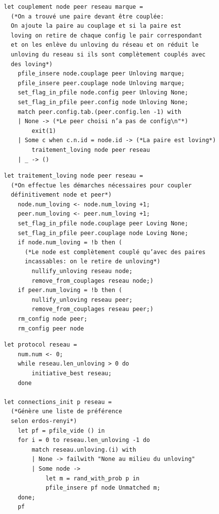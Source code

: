 \documentclass[aspectratio=43]{beamer}
\begin{document}
\begin{frame}[fragile]
    \begin{verbatim}
let couplement node peer reseau marque =
  (*On a trouvé une paire devant être couplée:
  On ajoute la paire au couplage et si la paire est
  loving on retire de chaque config le pair correspondant
  et on les enlève du unloving du réseau et on réduit le
  unloving du reseau si ils sont complètement couplés avec
  des loving*)
    pfile_insere node.couplage peer Unloving marque;
    pfile_insere peer.couplage node Unloving marque;
    set_flag_in_pfile node.config peer Unloving None;
    set_flag_in_pfile peer.config node Unloving None;
    match peer.config.tab.(peer.config.len -1) with
    | None -> (*Le peer choisi n’a pas de config\n"*)
        exit(1)
    | Some c when c.n.id = node.id -> (*La paire est loving*)
        traitement_loving node peer reseau
    | _ -> ()
    \end{verbatim}
\end{frame}

\begin{frame}[fragile]
    \begin{verbatim}
let traitement_loving node peer reseau =
  (*On effectue les démarches nécessaires pour coupler
  définitivement node et peer*)
    node.num_loving <- node.num_loving +1;
    peer.num_loving <- peer.num_loving +1;
    set_flag_in_pfile node.couplage peer Loving None;
    set_flag_in_pfile peer.couplage node Loving None;
    if node.num_loving = !b then (
      (*Le node est complètement couplé qu’avec des paires
      incassables: on le retire de unloving*)
        nullify_unloving reseau node;
        remove_from_couplages reseau node;)
    if peer.num_loving = !b then (
        nullify_unloving reseau peer;
        remove_from_couplages reseau peer;)
    rm_config node peer;
    rm_config peer node
    \end{verbatim}
\end{frame}

\begin{frame}[fragile]
    \begin{verbatim}
let protocol reseau =
    num.num <- 0;
    while reseau.len_unloving > 0 do
        initiative_best reseau;
    done

let connections_init p reseau =
  (*Génère une liste de préférence
  selon erdos-renyi*)
    let pf = pfile_vide () in
    for i = 0 to reseau.len_unloving -1 do
        match reseau.unloving.(i) with
        | None -> failwith "None au milieu du unloving"
        | Some node ->
            let m = rand_with_prob p in
            pfile_insere pf node Unmatched m;
    done;
    pf
    \end{verbatim}
\end{frame}


\end{document}
